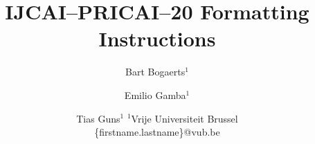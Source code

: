 \documentclass{article}
\title{IJCAI--PRICAI--20 Formatting Instructions}
\author{
Bart Bogaerts$^1$
\and
Emilio Gamba$^1$\and
Tias Guns$^1$
\affiliations
$^1$Vrije Universiteit Brussel\\
\emails
\{firstname.lastname\}@vub.be
}
\begin{document}
\maketitle

\begin{abstract}

\end{abstract}



\end{document}

